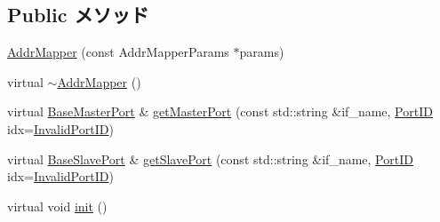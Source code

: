 \subsection*{Public メソッド}
\begin{DoxyCompactItemize}
\item 
\hyperlink{classAddrMapper_a65d4ce504585c7421d5f7e6aba8ac336}{AddrMapper} (const AddrMapperParams $\ast$params)
\item 
virtual \hyperlink{classAddrMapper_a934511153fe50240d4d25a79586c4006}{$\sim$AddrMapper} ()
\item 
virtual \hyperlink{classBaseMasterPort}{BaseMasterPort} \& \hyperlink{classAddrMapper_adc4e675e51defbdd1e354dac729d0703}{getMasterPort} (const std::string \&if\_\-name, \hyperlink{base_2types_8hh_acef4d7d41cb21fdc252e20c04cd7bb8e}{PortID} idx=\hyperlink{base_2types_8hh_a65bf40f138cf863f0c5e2d8ca1144126}{InvalidPortID})
\item 
virtual \hyperlink{classBaseSlavePort}{BaseSlavePort} \& \hyperlink{classAddrMapper_ac918a145092d7514ebc6dbd952dceafb}{getSlavePort} (const std::string \&if\_\-name, \hyperlink{base_2types_8hh_acef4d7d41cb21fdc252e20c04cd7bb8e}{PortID} idx=\hyperlink{base_2types_8hh_a65bf40f138cf863f0c5e2d8ca1144126}{InvalidPortID})
\item 
virtual void \hyperlink{classAddrMapper_a02fd73d861ef2e4aabb38c0c9ff82947}{init} ()
\end{DoxyCompactItemize}

